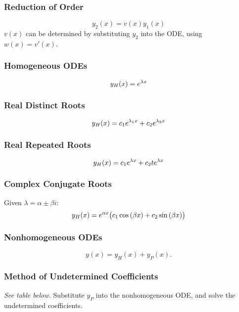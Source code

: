 \documentclass{article}
\begin{document}
\begin{multicols}{3}
    \subsubsection*{Reduction of Order}
    \begin{equation*}
        y_2(x) = v\left(x\right) y_1(x)
    \end{equation*}
    $v(x)$ can be determined by substituting $y_2$ into the ODE, using $w(x) = v'(x)$.
    \subsubsection*{Homogeneous ODEs}
    \begin{equation*}
        y_H(x) = e^{\lambda x}
    \end{equation*}
    \subsubsection*{Real Distinct Roots}
    \begin{equation*}
        y_H(x) = c_1e^{\lambda_1 x} + c_2e^{\lambda_2 x}
    \end{equation*}
    \subsubsection*{Real Repeated Roots}
    \begin{equation*}
        y_H(x) = c_1e^{\lambda x} + c_2 te^{\lambda x}
    \end{equation*}
    \subsubsection*{Complex Conjugate Roots}
    Given $\lambda = \alpha \pm \beta i$:
    \begin{equation*}
        y_H(x) = e^{\alpha x}\bigl( c_1\cos{\left( \beta x \right)} + c_2 \sin{\left( \beta x \right)} \bigr)
    \end{equation*}
    \subsubsection*{Nonhomogeneous ODEs}
    \begin{equation*}
        y(x) = y_H(x) + y_P(x).
    \end{equation*}
    \subsubsection*{Method of Undetermined Coefficients}
    \emph{See table below.}
    Substitute $y_P$ into the nonhomogeneous ODE, and solve the undetermined coefficients.

\end{multicols}
\end{document}
